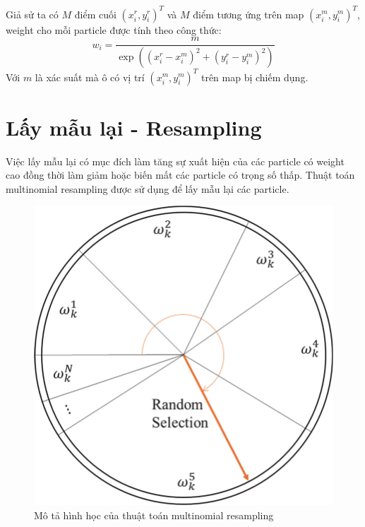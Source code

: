 \documentclass[../../main.tex]{subfiles}
\begin{document}
Giả sử  ta có $M$ điểm cuối $(x_i^r, y_i^r)^T$ và $M$ điểm tương ứng trên map $(x_i^m, y_i^m)^T$, weight cho mỗi particle được tính theo công thức:
\begin{equation}
    w_i = \frac{m}{\exp((x_i^r-x_i^m)^2 + (y_i^r - y_i^m)^2)}
\end{equation}
Với $m$ là xác suất mà ô có vị trí $(x_i^m, y_i^m)^T$ trên map bị chiếm dụng.

\section{Lấy mẫu lại - Resampling}
Việc lấy mẫu lại có mục đích làm tăng sự xuất hiện của các particle có weight cao đồng thời làm giảm hoặc biến mất các particle có trọng số thấp.
Thuật toán multinomial resampling được sử dụng để lấy mẫu lại các particle.

\begin{figure}[H]
    \begin{center}
        \includegraphics[scale=0.2]{Visualization-of-multinomial-resampling-algorithm.png}
    \end{center}
    \caption{Mô tả hình học của thuật toán multinomial resampling}
    \label{fig:Visualization-of-multinomial-resampling-algorithm}
\end{figure}
\end{document}
